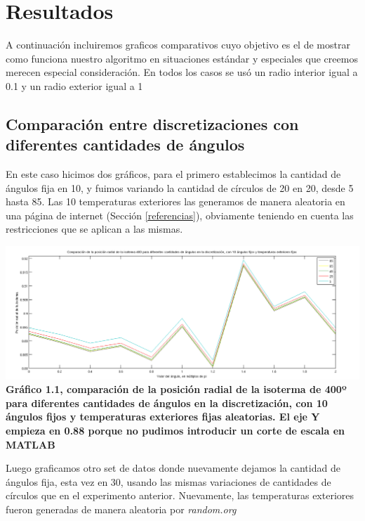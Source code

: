 \section{Resultados}

A continuación incluiremos graficos comparativos cuyo objetivo es el de mostrar como funciona nuestro algoritmo en situaciones estándar y especiales que creemos merecen especial consideración. En todos los casos se usó un radio interior igual a 0.1 y un radio exterior igual a 1

\subsection{Comparación entre discretizaciones con diferentes cantidades de ángulos}

En este caso hicimos dos gráficos, para el primero establecimos la cantidad de ángulos fija en 10, y fuimos variando la cantidad de círculos de 20 en 20, desde 5 hasta 85. Las 10 temperaturas exteriores las generamos de manera aleatoria en una página de internet (Sección \ref{referencias}), obviamente teniendo en cuenta las restricciones que se aplican a las mismas.

\vspace{2cm}

\begin{center}
\includegraphics[scale=0.45]{../img/correccion-10ang.png}
\scriptsize{\textsf{\textbf{Gr\'afico 1.1, comparación de la posición radial de la isoterma de 400º para diferentes cantidades de ángulos en la discretización, con 10 ángulos fijos y temperaturas exteriores fijas aleatorias. El eje Y empieza en 0.88 porque no pudimos introducir un corte de escala en MATLAB}}}
\end{center}

\vspace{2cm}


Luego graficamos otro set de datos donde nuevamente dejamos la cantidad de ángulos fija, esta vez en 30, usando las mismas variaciones de cantidades de círculos que en el experimento anterior. Nuevamente, las temperaturas exteriores fueron generadas de manera aleatoria por \textit{random.org}

